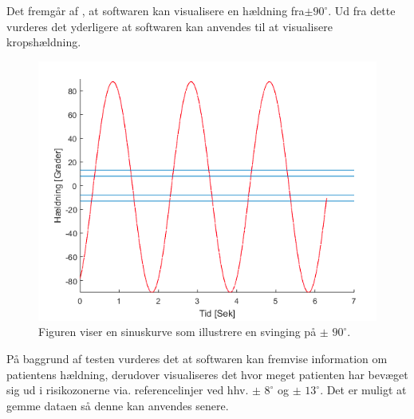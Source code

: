 Det fremgår af , at softwaren kan visualisere en hældning fra$\pm90^{\circ}$. Ud fra dette vurderes det yderligere at softwaren kan anvendes til at visualisere kropshældning. 

\begin{figure}[H] 
	\centering 
	\includegraphics[scale=0.5]{figures/cProblemloesning/sinus.PNG}
	\caption{Figuren viser en sinuskurve som illustrere en svinging på $\pm$ $90^{\circ}$.}
	\label{Fig:software_sinus}
\end{figure}

På baggrund af testen vurderes det at softwaren kan fremvise information om patientens hældning, derudover visualiseres det hvor meget patienten har bevæget sig ud i risikozonerne via. referencelinjer ved hhv. $\pm$ $8^{\circ}$ og $\pm$ $13^{\circ}$. Det er muligt at gemme dataen så denne kan anvendes senere. 





